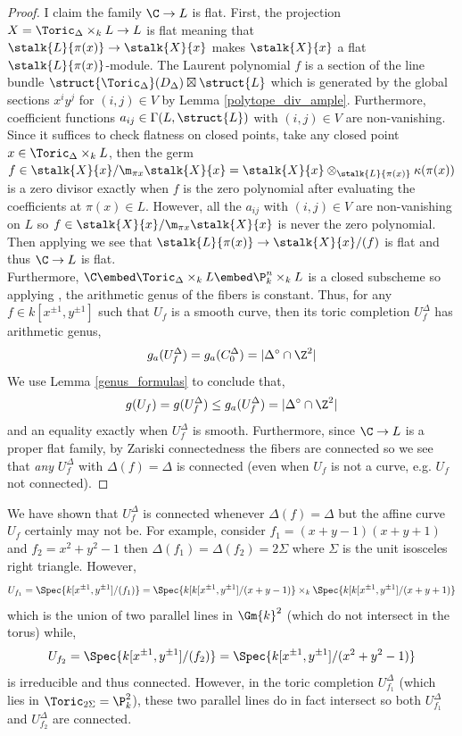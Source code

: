 \begin{proof}
I claim the family $\C \to L$ is flat. First, the projection $X = \Toric_{\Delta} \times_k L \to L$ is flat meaning that $\stalk{L}{\pi(x)} \to \stalk{X}{x}$ makes $\stalk{X}{x}$ a flat $\stalk{L}{\pi(x)}$-module. The Laurent polynomial $f$ is a section of the line bundle $\struct{\Toric_\Delta}(D_\Delta) \boxtimes \struct{L}$ which is generated by the global sections $x^i y^j$ for $(i,j) \in V$ by Lemma \ref{polytope_div_ample}. Furthermore, coefficient functions $a_{ij} \in \Gamma(L, \struct{L})$ with $(i,j) \in V$ are non-vanishing. Since it suffices to check flatness on closed points, take any closed point $x \in \Toric_\Delta \times_k L$, then the germ $f \in \stalk{X}{x} / \m_{\pi{x}} \stalk{X}{x} = \stalk{X}{x}\otimes_{\stalk{L}{\pi(x)}} \kappa(\pi(x))$ is a zero divisor exactly when $f$ is the zero polynomial after evaluating the coefficients at $\pi(x) \in L$. However, all the $a_{ij}$ with $(i, j) \in V$ are non-vanishing on $L$ so $f \in \stalk{X}{x} / \m_{\pi{x}} \stalk{X}{x}$ is never the zero polynomial. Then applying \cite[\href{https://stacks.math.columbia.edu/tag/046Z}{Tag 046Z}]{stacks-project} we see that $\stalk{L}{\pi(x)} \to \stalk{X}{x}/(f)$ is flat and thus $\C \to L$ is flat.
\bigskip\\
Furthermore, $\C \embed \Toric_\Delta \times_k L\embed \P^n_k \times_k L$ is a closed subscheme so applying \cite[Thm. III.9.10]{har}, the arithmetic genus of the fibers is constant. Thus, for any $f \in k[x^{\pm 1}, y^{\pm 1}]$ such that $U_f$ is a smooth curve, then its toric completion $U_f^\Delta$ has arithmetic genus,
\[ g_a(U_f^\Delta) = g_a(C_0^\Delta) = | \Delta^\circ \cap \Z^2 | \]
We use Lemma \ref{genus_formulas} to conclude that,
\[ g(U_f) = g(U_f^\Delta) \le g_a(U_f^\Delta) = | \Delta^\circ \cap \Z^2 | \]
and an equality exactly when $U_f^\Delta$ is smooth. Furthermore, since $\C \to L$ is a proper flat family, by Zariski connectedness the fibers are connected so we see that \textit{any} $U_f^\Delta$ with $\Delta(f) = \Delta$ is connected (even when $U_f$ is not a curve, e.g. $U_f$ not connected).
\end{proof}

\begin{rmk}
We have shown that $U_f^\Delta$ is connected whenever $\Delta(f) = \Delta$ but the affine curve $U_f$ certainly may not be. For example, consider $f_1 = (x + y - 1)(x + y + 1)$ and $f_2 = x^2 + y^2 - 1$ then $\Delta(f_1) = \Delta(f_2) = 2 \Sigma$ where $\Sigma$ is the unit isosceles right triangle. However, 
\[ U_{f_1} = \Spec{k[x^{\pm 1}, y^{\pm 1}]/(f_1)} = \Spec{k[k[x^{\pm 1}, y^{\pm 1}]/(x + y - 1)} \times_k \Spec{k[k[x^{\pm 1}, y^{\pm 1}]/(x + y + 1)} \]
which is the union of two parallel lines in $\Gm{k}^2$ (which do not intersect in the torus) while,
\[ U_{f_2} = \Spec{k[x^{\pm 1}, y^{\pm 1}]/(f_2)} = \Spec{k[x^{\pm 1}, y^{\pm 1}]/(x^2 + y^2 - 1)} \]
is irreducible and thus connected. However, in the toric completion $U_{f_1}^\Delta$ (which lies in $\Toric_{2 \Sigma} = \P^2_k$), these two parallel lines do in fact intersect so both $U_{f_1}^\Delta$ and $U_{f_2}^\Delta$ are connected.
\end{rmk}


